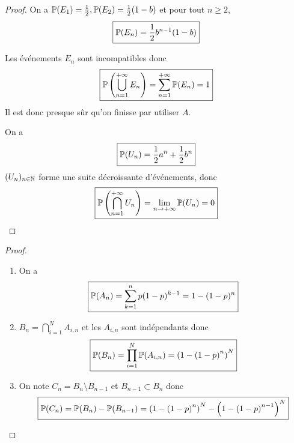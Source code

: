 \documentclass[12pt]{article}
\begin{document}
\begin{proof}
    On a $\P(E_{1})=\frac{1}{2},\P(E_{2})=\frac{1}{2}(1-b)$ et pour tout $n\geqslant2$,
    \begin{equation}
        \boxed{\P(E_{n})=\frac{1}{2}b^{n-1}(1-b)}
    \end{equation}

    Les événements $E_{n}$ sont incompatibles donc 
    \begin{equation}
        \boxed{\P\left(\bigcup_{n=1}^{+\infty}E_{n}\right)=\sum_{n=1}^{+\infty}\P(E_{n})=1}
    \end{equation}
    Il est donc presque sûr qu'on finisse par utiliser $A$.

    On a 
    \begin{equation}
        \boxed{\P(U_{n})=\frac{1}{2}a^{n}+\frac{1}{2}b^{n}}
    \end{equation}
    $(U_{n})_{n\in\N}$ forme une suite décroissante d'événements, donc 
    \begin{equation}
        \boxed{\P\left(\bigcap_{n=1}^{+\infty}U_{n}\right)=\lim\limits_{n\to+\infty}\P(U_{n})=0}
    \end{equation}
\end{proof}

\begin{proof}
    \phantom{}
    \begin{enumerate}
        \item On a 
        \begin{equation}
            \boxed{\P(A_{n})=\sum_{k=1}^{n}p(1-p)^{k-1}=1-(1-p)^{n}}
        \end{equation}

        \item $B_{n}=\bigcap_{i=1}^{N}A_{i,n}$ et les $A_{i,n}$ sont indépendants donc 
        \begin{equation}
            \boxed{\P(B_{n})=\prod_{i=1}^{N}\P(A_{i,n})=\left(1-\left(1-p\right)^{n}\right)^{N}}
        \end{equation}

        \item On note $C_{n}=B_{n}\setminus B_{n-1}$ et $B_{n-1}\subset B_{n}$ donc 
        \begin{equation}
            \boxed{\P(C_{n})=\P(B_{n})-\P(B_{n-1})=\left(1-\left(1-p\right)^{n}\right)^{N}-\left(1-\left(1-p\right)^{n-1}\right)^{N}}
        \end{equation}
    \end{enumerate}
\end{proof}
\end{document}
